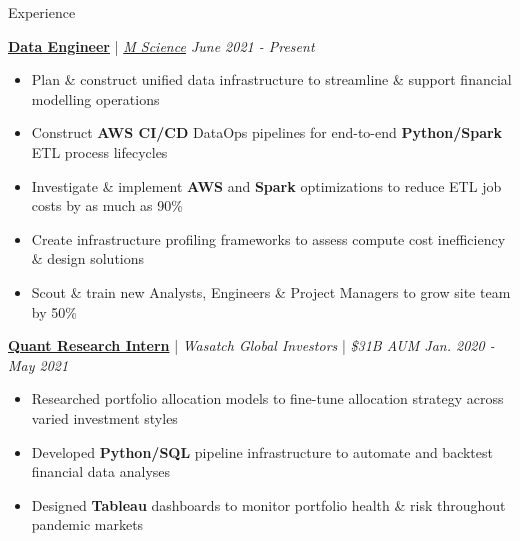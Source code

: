 \documentclass{resume/resume}
\begin{document}
\begin{rSection}{Experience}

  \href{https://mscience.com/}{\bf Data Engineer} | {\em \href{https://mscience.com}{M Science} \hfill June 2021 - Present}
  \vspace{-6pt}
  \begin{itemize}[nosep]
    \item Plan \& construct unified data infrastructure to streamline \& support financial modelling operations
    \item Construct {\bf AWS CI/CD} DataOps pipelines for end-to-end {\bf Python/Spark} ETL process lifecycles
    \item Investigate \& implement {\bf AWS} and {\bf Spark} optimizations to reduce ETL job costs by as much as 90\%
    \item Create infrastructure profiling frameworks to assess compute cost inefficiency \& design solutions
    \item Scout \& train new Analysts, Engineers \& Project Managers to grow site team by 50\%
  \end{itemize}

  \href{https://wasatchglobal.com/}{\bf Quant Research Intern} | {\em Wasatch Global Investors} | {\em \$31B AUM \hfill Jan. 2020 - May 2021}
  \vspace{-6pt}
  \begin{itemize}[nosep]
    \item Researched portfolio allocation models to fine-tune allocation strategy across varied investment styles
    \item Developed {\bf Python/SQL} pipeline infrastructure to automate and backtest financial data analyses
    \item Designed {\bf Tableau} dashboards to monitor portfolio health \& risk throughout pandemic markets
  \end{itemize}


\end{rSection}
\end{document}
